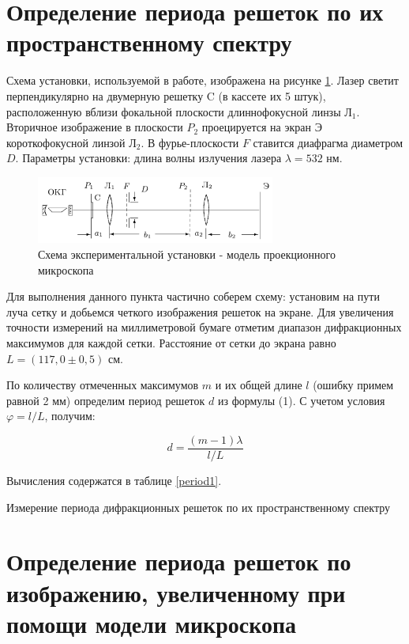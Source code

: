 \documentclass[12pt]{kiarticle} %
\begin{document}
	
	\section{Определение периода решеток по их пространственному спектру}
	
	Схема установки, используемой в работе, изображена на рисунке \ref{shema}. Лазер светит перпендикулярно на двумерную решетку C (в кассете их 5 штук), расположенную вблизи фокальной плоскости длиннофокусной линзы $\text{Л}_1$. Вторичное изображение в плоскости $P_2$ проецируется на экран Э короткофокусной линзой $\text{Л}_2$. В фурье-плоскости $F$ ставится диафрагма диаметром $D$. Параметры установки: длина волны излучения лазера $\lambda = 532$ нм.
	
	\begin{figure}[h]
		\centering	
		\includegraphics[width=0.7\textwidth]{shema.png}
		\caption{Схема экспериментальной установки - модель проекционного микроскопа}
		\label{shema}
	\end{figure}
	
	Для выполнения данного пункта частично соберем схему: установим на пути луча сетку и добьемся четкого изображения решеток на экране. Для увеличения точности измерений на миллиметровой бумаге отметим диапазон дифракционных максимумов для каждой сетки. Расстояние от сетки до экрана равно $L = (117,0 \pm 0,5)$ см. 
	
	По количеству отмеченных максимумов $m$ и их общей длине $l$ (ошибку примем равной 2 мм) определим период решеток $d$ из формулы (1). С учетом условия $\varphi = l/L$, получим:
	
	\[ d = \frac{(m-1)\lambda}{l/L} \]
	
	Вычисления содержатся в таблице \ref{period1}.
	
	\begin{table}[h]
		\centering
		
		\caption{Измерение периода дифракционных решеток по их пространственному спектру}
		\label{period1}
	\end{table}	
	
	\section{Определение периода решеток по изображению, увеличенному при помощи модели микроскопа}
	
\end{document}
